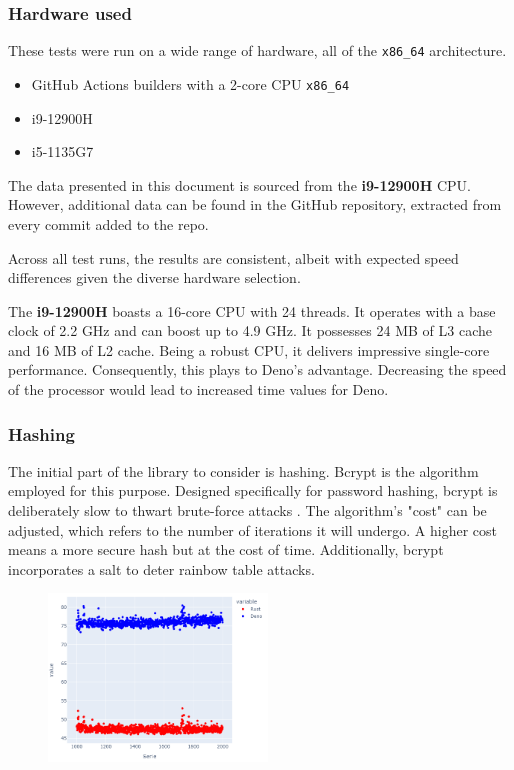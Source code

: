 \documentclass[10pt,journal,compsoc]{IEEEtran}
\begin{document}
\subsubsection{Hardware used}

These tests were run on a wide range of hardware, all of the \verb|x86_64| architecture.

\begin{itemize}
    \item GitHub Actions builders with a 2-core CPU \verb|x86_64| \cite{Github}
    \item i9-12900H
    \item i5-1135G7
\end{itemize}

The data presented in this document is sourced from the \textbf{i9-12900H} CPU. However, additional data can be found in the GitHub repository, extracted from every commit added to the repo.

Across all test runs, the results are consistent, albeit with expected speed differences given the diverse hardware selection.

The \textbf{i9-12900H} boasts a 16-core CPU with 24 threads. It operates with a base clock of 2.2 GHz and can boost up to 4.9 GHz. It possesses 24 MB of L3 cache and 16 MB of L2 cache. Being a robust CPU, it delivers impressive single-core performance. Consequently, this plays to Deno's advantage. Decreasing the speed of the processor would lead to increased time values for Deno.

\subsubsection{Hashing}

The initial part of the library to consider is hashing. Bcrypt is the algorithm employed for this purpose. Designed specifically for password hashing, bcrypt is deliberately slow to thwart brute-force attacks \cite{Bcrypt}. The algorithm's "cost" can be adjusted, which refers to the number of iterations it will undergo. A higher cost means a more secure hash but at the cost of time. Additionally, bcrypt incorporates a salt to deter rainbow table attacks.

\begin{figure}[H]
    \centering
    \includegraphics[width=0.52\textwidth]{hashing_lines}
\end{figure}
\end{document}
